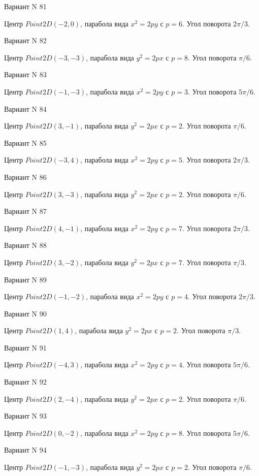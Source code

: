 \documentclass[11pt]{report}
\begin{document}
Вариант N 81

Центр $Point2D\left(-2, 0\right)$, парабола вида $x^{2} = 2py$ с $p = 6$. Угол поворота $2 \pi / 3$.

Вариант N 82

Центр $Point2D\left(-3, -3\right)$, парабола вида $y^{2} = 2px$ с $p = 8$. Угол поворота $\pi / 6$.

Вариант N 83

Центр $Point2D\left(-1, -3\right)$, парабола вида $x^{2} = 2py$ с $p = 3$. Угол поворота $5 \pi / 6$.

Вариант N 84

Центр $Point2D\left(3, -1\right)$, парабола вида $y^{2} = 2px$ с $p = 2$. Угол поворота $\pi / 6$.

Вариант N 85

Центр $Point2D\left(-3, 4\right)$, парабола вида $x^{2} = 2py$ с $p = 5$. Угол поворота $2 \pi / 3$.

Вариант N 86

Центр $Point2D\left(3, -3\right)$, парабола вида $y^{2} = 2px$ с $p = 2$. Угол поворота $\pi / 6$.

Вариант N 87

Центр $Point2D\left(4, -1\right)$, парабола вида $x^{2} = 2py$ с $p = 7$. Угол поворота $2 \pi / 3$.

Вариант N 88

Центр $Point2D\left(3, -2\right)$, парабола вида $y^{2} = 2px$ с $p = 7$. Угол поворота $\pi / 3$.

Вариант N 89

Центр $Point2D\left(-1, -2\right)$, парабола вида $x^{2} = 2py$ с $p = 4$. Угол поворота $2 \pi / 3$.

Вариант N 90

Центр $Point2D\left(1, 4\right)$, парабола вида $y^{2} = 2px$ с $p = 2$. Угол поворота $\pi / 3$.

Вариант N 91

Центр $Point2D\left(-4, 3\right)$, парабола вида $x^{2} = 2py$ с $p = 4$. Угол поворота $5 \pi / 6$.

Вариант N 92

Центр $Point2D\left(2, -4\right)$, парабола вида $y^{2} = 2px$ с $p = 2$. Угол поворота $\pi / 6$.

Вариант N 93

Центр $Point2D\left(0, -2\right)$, парабола вида $x^{2} = 2py$ с $p = 8$. Угол поворота $5 \pi / 6$.

Вариант N 94

Центр $Point2D\left(-1, -3\right)$, парабола вида $y^{2} = 2px$ с $p = 2$. Угол поворота $\pi / 6$.
\end{document}
